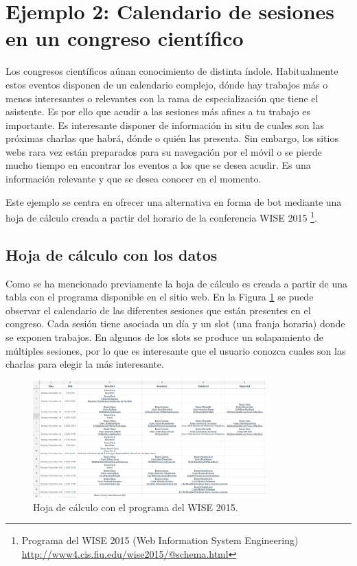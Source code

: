 \section{Ejemplo 2: Calendario de sesiones en un congreso científico}

Los congresos científicos aúnan conocimiento de distinta índole. Habitualmente estos eventos disponen de un calendario complejo, dónde hay trabajos más o menos interesantes o relevantes con la rama de especialización que tiene el asistente. Es por ello que acudir a las sesiones más afines a tu trabajo es importante. Es interesante disponer de información in situ de cuales son las próximas charlas que habrá, dónde o quién las presenta. Sin embargo, los sitios webs rara vez están preparados para su navegación por el móvil o se pierde mucho tiempo en encontrar los eventos a los que se desea acudir. Es una información relevante y que se desea conocer en el momento.

Este ejemplo se centra en ofrecer una alternativa en forma de bot mediante una hoja de cálculo creada a partir del horario de la conferencia WISE 2015 \footnote{Programa del WISE 2015 (Web Information System Engineering) \url{http://www4.cis.fiu.edu/wise2015/@schema.html}}.

\subsection{Hoja de cálculo con los datos}

Como se ha mencionado previamente la hoja de cálculo es creada a partir de una tabla con el programa disponible en el sitio web. En la Figura \ref{fig:SheetConference} se puede observar el calendario de las diferentes sesiones que están presentes en el congreso. Cada sesión tiene asociada un día y un slot (una franja horaria) donde se exponen trabajos. En algunos de los slots se produce un solapamiento de múltiples sesiones, por lo que es interesante que el usuario conozca cuales son las charlas para elegir la más interesante.

\begin{figure}[htb]
	\centering
	\includegraphics[width=0.8\textwidth]{./figs/sheetConference.png}
	\caption{Hoja de cálculo con el programa del WISE 2015.}
	\label{fig:SheetConference}
\end{figure}

